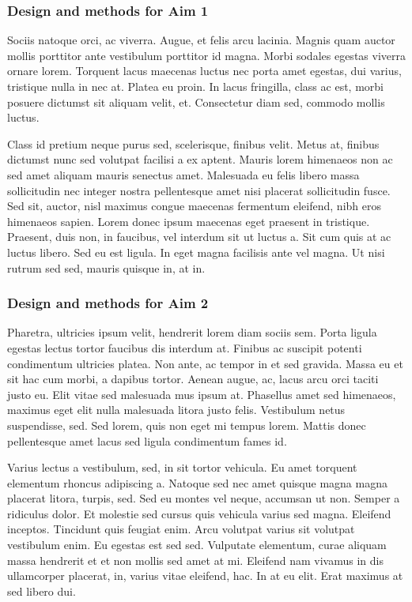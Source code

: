 \documentclass[
  11pt,
  letterpaper,
  DIV=11,
  numbers=noendperiod]{scrartcl}
\begin{document}
\hypertarget{design-and-methods-for-aim-1}{%
\subsubsection{Design and methods for Aim
1}\label{design-and-methods-for-aim-1}}

Sociis natoque orci, ac viverra. Augue, et felis arcu lacinia. Magnis
quam auctor mollis porttitor ante vestibulum porttitor id magna. Morbi
sodales egestas viverra ornare lorem. Torquent lacus maecenas luctus nec
porta amet egestas, dui varius, tristique nulla in nec at. Platea eu
proin. In lacus fringilla, class ac est, morbi posuere dictumst sit
aliquam velit, et. Consectetur diam sed, commodo mollis luctus.

Class id pretium neque purus sed, scelerisque, finibus velit. Metus at,
finibus dictumst nunc sed volutpat facilisi a ex aptent. Mauris lorem
himenaeos non ac sed amet aliquam mauris senectus amet. Malesuada eu
felis libero massa sollicitudin nec integer nostra pellentesque amet
nisi placerat sollicitudin fusce. Sed sit, auctor, nisl maximus congue
maecenas fermentum eleifend, nibh eros himenaeos sapien. Lorem donec
ipsum maecenas eget praesent in tristique. Praesent, duis non, in
faucibus, vel interdum sit ut luctus a. Sit cum quis at ac luctus
libero. Sed eu est ligula. In eget magna facilisis ante vel magna. Ut
nisi rutrum sed sed, mauris quisque in, at in.

\hypertarget{design-and-methods-for-aim-2}{%
\subsubsection{Design and methods for Aim
2}\label{design-and-methods-for-aim-2}}

Pharetra, ultricies ipsum velit, hendrerit lorem diam sociis sem. Porta
ligula egestas lectus tortor faucibus dis interdum at. Finibus ac
suscipit potenti condimentum ultricies platea. Non ante, ac tempor in et
sed gravida. Massa eu et sit hac cum morbi, a dapibus tortor. Aenean
augue, ac, lacus arcu orci taciti justo eu. Elit vitae sed malesuada mus
ipsum at. Phasellus amet sed himenaeos, maximus eget elit nulla
malesuada litora justo felis. Vestibulum netus suspendisse, sed. Sed
lorem, quis non eget mi tempus lorem. Mattis donec pellentesque amet
lacus sed ligula condimentum fames id.

Varius lectus a vestibulum, sed, in sit tortor vehicula. Eu amet
torquent elementum rhoncus adipiscing a. Natoque sed nec amet quisque
magna magna placerat litora, turpis, sed. Sed eu montes vel neque,
accumsan ut non. Semper a ridiculus dolor. Et molestie sed cursus quis
vehicula varius sed magna. Eleifend inceptos. Tincidunt quis feugiat
enim. Arcu volutpat varius sit volutpat vestibulum enim. Eu egestas est
sed sed. Vulputate elementum, curae aliquam massa hendrerit et et non
mollis sed amet at mi. Eleifend nam vivamus in dis ullamcorper placerat,
in, varius vitae eleifend, hac. In at eu elit. Erat maximus at sed
libero dui.
\end{document}
